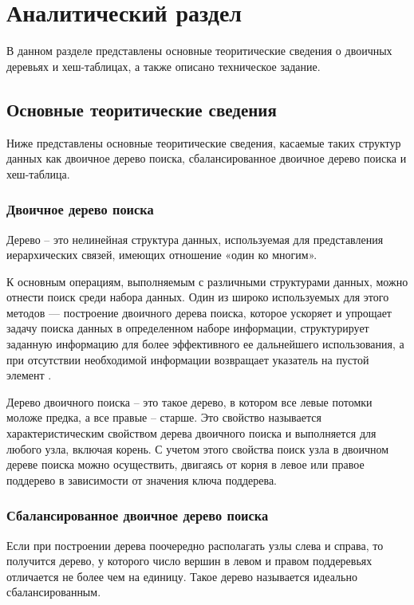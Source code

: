 \chapter{Аналитический раздел}

В данном разделе представлены основные теоритические сведения о двоичных деревьях и хеш-таблицах, а также описано техническое задание.

\section{Основные теоритические сведения}

Ниже представлены основные теоритические сведения, касаемые таких структур данных как двоичное дерево поиска, сбалансированное двоичное дерево поиска и хеш-таблица.

\subsection{Двоичное дерево поиска}

Дерево  –  это  нелинейная  структура  данных,  используемая  для  представления 
иерархических связей, имеющих отношение «один ко многим». 

К  основным  операциям,  выполняемым  с  различными  структурами 
данных,  можно  отнести  поиск  среди  набора  данных.  Один  из  широко 
используемых  для  этого  методов  —  построение  двоичного  дерева  поиска, которое ускоряет и упрощает задачу поиска данных в определенном  наборе  информации,  структурирует  заданную  информацию  для 
более  эффективного  ее  дальнейшего  использования,  а  при  отсутствии 
необходимой информации возвращает указатель на пустой элемент \cite{virt}. 

Дерево двоичного поиска –  это такое дерево, в котором все левые потомки моложе 
предка,  а  все  правые  – старше.  Это  свойство  называется  характеристическим 
свойством дерева двоичного поиска и выполняется для любого узла, включая корень. 
С учетом этого свойства поиск узла в двоичном дереве поиска можно осуществить, 
двигаясь от корня в левое или правое поддерево в зависимости от значения ключа 
поддерева. 

\subsection{Сбалансированное двоичное дерево поиска}

Если  при  построении  дерева  поочередно  располагать  узлы  слева  и  справа,  то 
получится дерево, у которого число вершин в левом и правом поддеревьях отличается 
не более чем на единицу. Такое дерево называется идеально сбалансированным.

